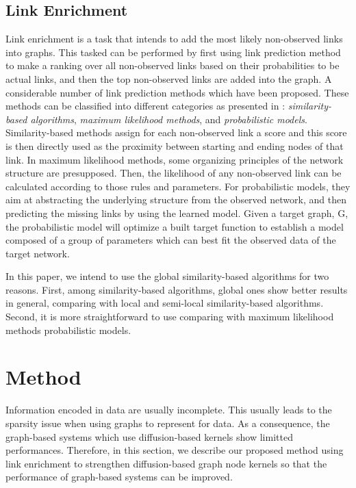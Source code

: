 \documentclass[runningheads,a4paper]{llncs}
\begin{document}
\subsection{Link Enrichment}
\label{link-enrichment}
Link enrichment is a task that intends to add the most likely non-observed links into graphs. This tasked can be performed by first using link prediction method to make a ranking over all non-observed links based on their probabilities to be actual links, and then the top non-observed links are added into the graph. A considerable number of link prediction methods which have been proposed. These methods can be classified into different categories as presented in \cite{jour2}: \textit{similarity-based algorithms}, \textit{maximum likelihood methods}, and \textit{probabilistic models}. Similarity-based methods assign for each non-observed link a score and this score is then directly used as the proximity between starting and ending nodes of that link. In maximum likelihood methods, some organizing principles of the network structure are presupposed. Then, the likelihood of any non-observed link can be calculated according to those rules and parameters. For probabilistic models, they aim at abstracting the underlying structure from the observed network, and then predicting the missing links by using the learned model. Given a target graph, G, the probabilistic model will optimize a built target function to establish a model composed of a group of parameters which can best fit the observed data of the target network.

In this paper, we intend to use the global similarity-based algorithms for two reasons. First, among similarity-based algorithms, global ones show better results in general, comparing with local and semi-local similarity-based algorithms. Second, it is more straightforward to use comparing with maximum likelihood methods probabilistic models.
\section{Method}
\label{method}
Information encoded in data are usually incomplete. This usually leads to the sparsity issue when using graphs to represent for data. As a consequence, the graph-based systems which use diffusion-based kernels show limitted performances. Therefore, in this section, we describe our proposed method using link enrichment to strengthen diffusion-based graph node kernels so that the performance of graph-based systems can be improved.
\end{document}
